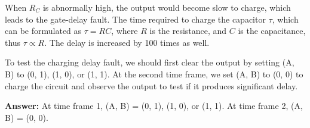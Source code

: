 When $R_C$ is abnormally high, the output would become slow to charge, which leads to the gate-delay fault. The time required to charge the capacitor $\tau$, which can be formulated as $\tau = RC$, where $R$ is the resistance, and $C$ is the capacitance, thus $\tau \propto R$. The delay is increased by 100 times as well.

To test the charging delay fault, we should first clear the output by setting (A, B) to (0, 1), (1, 0), or (1, 1). At the second time frame, we set (A, B) to (0, 0) to charge the circuit and observe the output to test if it produces significant delay.

\textbf{Answer:} At time frame 1, (A, B) = (0, 1), (1, 0), or (1, 1). At time frame 2, (A, B) = (0, 0).
